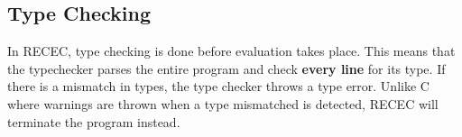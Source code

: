 \documentclass[a4paper]{article}
\begin{document}
\subsection{Type Checking}

In RECEC, type checking is done before evaluation takes place. This means that the typechecker parses the entire program and check \textbf{every line} for its type. If there is a mismatch in types, the type checker throws a type error. Unlike C where warnings are thrown when a type mismatched is detected, RECEC will terminate the program instead. 
\end{document}
